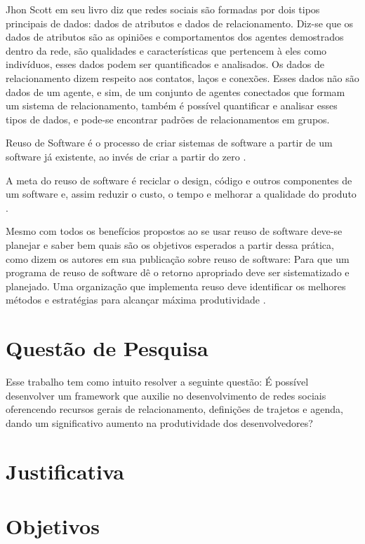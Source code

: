 Jhon Scott em seu livro \cite{Scott:Carrington:2011} diz que redes sociais são formadas por dois tipos principais de dados: dados de atributos e dados de relacionamento. Diz-se que os dados de atributos são as opiniões e comportamentos dos agentes demostrados dentro da rede, são qualidades e características que pertencem à eles como indivíduos, esses dados podem ser quantificados e analisados. Os dados de relacionamento dizem respeito aos contatos, laços e conexões. Esses dados não são dados de um agente, e sim, de um conjunto de agentes conectados que formam um sistema de relacionamento, também é possível quantificar e analisar esses tipos de dados, e pode-se encontrar padrões de relacionamentos em grupos.

Reuso de Software é o processo de criar sistemas de software a partir de um software já existente, ao invés de criar a partir do zero \cite{Krueger:1992}.

A meta do reuso de software é reciclar o design, código e outros componentes de um software e, assim reduzir o custo, o tempo e melhorar a qualidade do produto \cite{Keswani:Joshi:Jatain:2014}.

Mesmo com todos os benefícios propostos ao se usar reuso de software deve-se planejar e saber bem quais são os objetivos esperados a partir dessa prática, como dizem os autores em sua publicação sobre reuso de software: Para que um programa de reuso de software dê o retorno apropriado deve ser sistematizado e planejado. Uma organização que implementa reuso deve identificar os melhores métodos e estratégias para alcançar máxima produtividade \cite{Keswani:Joshi:Jatain:2014}.

\section*{Questão de Pesquisa}

Esse trabalho tem como intuito resolver a seguinte questão: É possível desenvolver um framework que auxilie no desenvolvimento de redes sociais oferencendo recursos gerais de relacionamento, definições de trajetos e agenda, dando um significativo aumento na produtividade dos desenvolvedores?

\section*{Justificativa}

\section*{Objetivos}

